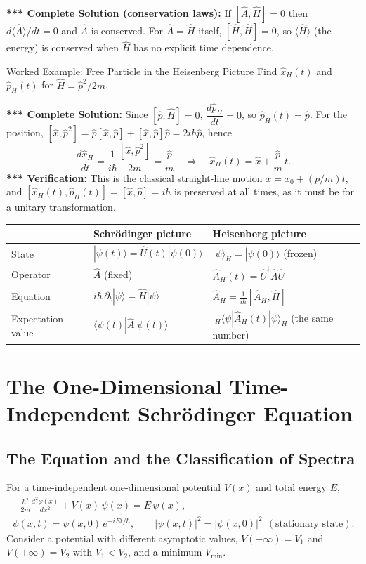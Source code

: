 \documentclass[11pt,a4paper]{article}
\begin{document}
\textbf{*** Complete Solution (conservation laws):} If $[\hat A,\hat H]=0$ then $d\langle\hat A\rangle/dt=0$ and $\hat A$ is conserved. For $\hat A=\hat H$ itself, $[\hat H,\hat H]=0$, so $\langle\hat H\rangle$ (the energy) is conserved when $\hat H$ has no explicit time dependence.

\begin{prob}{Worked Example: Free Particle in the Heisenberg Picture}
Find $\hat x_H(t)$ and $\hat p_H(t)$ for $\hat H=\hat p^2/2m$.
\end{prob}
\textbf{*** Complete Solution:} Since $[\hat p,\hat H]=0$, $\dfrac{d\hat p_H}{dt}=0$, so $\hat p_H(t)=\hat p$. For the position, $[\hat x,\hat p^2]=\hat p[\hat x,\hat p]+[\hat x,\hat p]\hat p=2i\hbar\hat p$, hence
\[
\frac{d\hat x_H}{dt}=\frac1{i\hbar}\frac{[\hat x,\hat p^2]}{2m}=\frac{\hat p}m\quad\Longrightarrow\quad \hat x_H(t)=\hat x+\frac{\hat p}m\,t .
\]
\textbf{*** Verification:} This is the classical straight-line motion $x=x_0+(p/m)t$, and $[\hat x_H(t),\hat p_H(t)]=[\hat x,\hat p]=i\hbar$ is preserved at all times, as it must be for a unitary transformation.

\begin{center}
\renewcommand{\arraystretch}{1.2}
\begin{tabular}{@{}lll@{}}
\toprule
 & \textbf{Schr\"odinger picture} & \textbf{Heisenberg picture}\\
\midrule
State & $|\psi(t)\rangle=\hat U(t)|\psi(0)\rangle$ & $|\psi\rangle_H=|\psi(0)\rangle$ (frozen)\\
Operator & $\hat A$ (fixed) & $\hat A_H(t)=\hat U^\dagger\hat A\hat U$\\
Equation & $i\hbar\,\partial_t|\psi\rangle=\hat H|\psi\rangle$ & $\dot{\hat A}_H=\frac1{i\hbar}[\hat A_H,\hat H]$\\
Expectation value & $\langle\psi(t)|\hat A|\psi(t)\rangle$ & $\ _H\langle\psi|\hat A_H(t)|\psi\rangle_H$ (the same number)\\
\bottomrule
\end{tabular}
\end{center}
\section{The One-Dimensional Time-Independent Schr\"odinger Equation}
\label{fd:sec:onedim}

\subsection{The Equation and the Classification of Spectra}
For a time-independent one-dimensional potential $V(x)$ and total energy $E$,
\begin{gather*}
-\frac{\hbar^2}{2m}\frac{d^2\psi(x)}{dx^2}+V(x)\,\psi(x)=E\,\psi(x),\\
\psi(x,t)=\psi(x,0)\,e^{-iEt/\hbar},\qquad |\psi(x,t)|^2=|\psi(x,0)|^2\ \ (\text{stationary state}).
\end{gather*}
Consider a potential with different asymptotic values, $V(-\infty)=V_1$ and $V(+\infty)=V_2$ with $V_1<V_2$, and a minimum $V_{\min}$.
\end{document}
